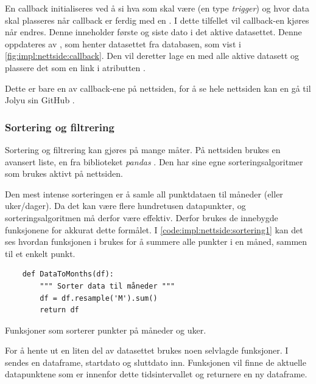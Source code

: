 En callback initialiseres ved å si hva som skal være  (en type \textit{trigger}) og hvor data skal plasseres når callback er ferdig med en . 
I dette tilfellet vil callback-en kjøres når  endres. 
Denne inneholder første og siste dato i det aktive datasettet. 
Denne oppdateres av , som henter datasettet fra databasen, som vist i \autoref{fig:impl:nettside:callback}. 
Den vil deretter lage en  med alle aktive datasett og plassere det som en link i atributten .

Dette er bare en av callback-ene på nettsiden, for å se hele nettsiden kan en gå til Jolyu sin GitHub \cite{GitHub}.

\subsubsection{Sortering og filtrering}\label{sec:impl:nettside:sortering}

Sortering og filtrering kan gjøres på mange måter. 
På nettsiden brukes en avansert liste, en  fra biblioteket \textit{pandas} \cite{dataframe}. 
Den har sine egne sorteringsalgoritmer som brukes aktivt på nettsiden. 

Den mest intense sorteringen er å samle all punktdataen til måneder (eller uker/dager). 
Da det kan være flere hundretusen datapunkter, og sorteringsalgoritmen må derfor være effektiv. 
Derfor brukes de innebygde funksjonene for akkurat dette formålet. 
I \autoref{code:impl:nettside:sortering1} kan det ses hvordan funksjonen  i  brukes for å summere alle punkter i en måned, sammen til et enkelt punkt.

\begin{listing}[!htb]
\begin{verbatim}
    def DataToMonths(df):
        """ Sorter data til måneder """
        df = df.resample('M').sum()
        return df
\end{verbatim}
\caption{Funksjoner som sorterer punkter på måneder og uker.}
\label{code:impl:nettside:sortering1}
\end{listing}

For å hente ut en liten del av datasettet brukes noen selvlagde funksjoner. 
I \\  sendes en dataframe, startdato og sluttdato inn. 
Funksjonen vil finne de aktuelle datapunktene som er innenfor dette tidsintervallet og returnere en ny dataframe.

